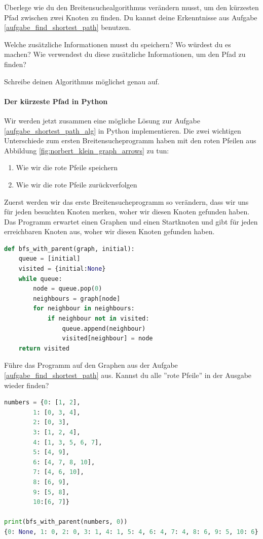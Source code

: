 \begin{aufgabe}\label{aufgabe_shortest_path_alg}
Überlege wie du den Breitensuchealgorithmus verändern musst, um den kürzesten Pfad zwischen zwei Knoten zu finden. Du kannst deine Erkenntnisse aus Aufgabe \ref{aufgabe_find_shortest_path} benutzen.

Welche zusätzliche Informationen musst du speichern? Wo würdest du es machen?
Wie verwendest du diese zusätzliche Informationen, um den Pfad zu finden?

Schreibe deinen Algorithmus möglichst genau auf.
\end{aufgabe}



\paragraph{Der kürzeste Pfad in Python}
Wir werden jetzt zusammen eine mögliche Lösung zur Aufgabe \ref{aufgabe_shortest_path_alg} in Python implementieren. Die zwei wichtigen Unterschiede zum ersten Breitensucheprogramm haben mit den roten Pfeilen aus Abbildung \ref{fig:norbert_klein_graph_arrows} zu tun:
\begin{enumerate}
    \item Wie wir die rote Pfeile speichern
    \item Wie wir die rote Pfeile zurückverfolgen
\end{enumerate}

Zuerst werden wir das erste Breitensucheprogramm so verändern, dass wir uns für jeden besuchten Knoten merken, woher wir diesen Knoten gefunden haben. Das Programm erwartet einen Graphen und einen Startknoten und gibt für jeden erreichbaren Knoten aus, woher wir diesen Knoten gefunden haben.

\begin{lstlisting}[language=Python, caption={Programm, welches die ''rote Pfeile'' ausgehend von einem Startknoten berechnet und ausgibt. Die einzigen zwei Zeilen, die sich verändert haben, sind 3 und 10.}, label={bfs_with_parent}]
def bfs_with_parent(graph, initial):
    queue = [initial]
    visited = {initial:None}
    while queue:
        node = queue.pop(0)
        neighbours = graph[node]
        for neighbour in neighbours:
            if neighbour not in visited:
                queue.append(neighbour)
                visited[neighbour] = node
    return visited
\end{lstlisting}

Führe das Programm auf den Graphen aus der Aufgabe \ref{aufgabe_find_shortest_path} aus. Kannst du alle ''rote Pfeile'' in der Ausgabe wieder finden?
\begin{lstlisting}[language=Python]
numbers = {0: [1, 2],
        1: [0, 3, 4],
        2: [0, 3],
        3: [1, 2, 4],
        4: [1, 3, 5, 6, 7],
        5: [4, 9],
        6: [4, 7, 8, 10],
        7: [4, 6, 10],
        8: [6, 9],
        9: [5, 8],
        10:[6, 7]}

print(bfs_with_parent(numbers, 0))
{0: None, 1: 0, 2: 0, 3: 1, 4: 1, 5: 4, 6: 4, 7: 4, 8: 6, 9: 5, 10: 6}
\end{lstlisting}

